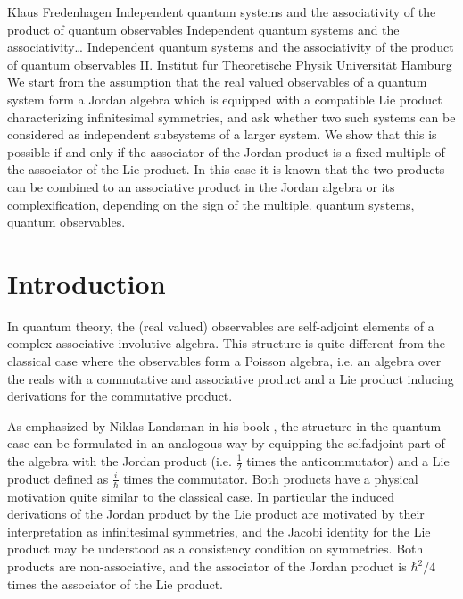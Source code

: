 \begin{artengenv}{Klaus Fredenhagen}
	{Independent quantum systems and the associativity of the product of quantum observables}
	{Independent quantum systems and the associativity\ldots}
	{Independent quantum systems and the associativity of the product of quantum observables}
	{II. Institut f\"ur Theoretische Physik Universit\"at Hamburg}
	{We start from the assumption that the real valued observables of a quantum system form a Jordan algebra which is equipped with a compatible Lie product characterizing infinitesimal symmetries,
		and ask whether two such systems can be considered as independent subsystems of a larger system. We show that this  is possible if and only if the associator of the Jordan product is a fixed multiple of the associator of the Lie product. In this case it is known that the two products can be combined to an associative product in the Jordan algebra or its complexification, depending on the sign of the multiple.}
	{quantum systems, quantum observables.}
	
	

\section{Introduction}
\lettrine[loversize=0.13,lines=2,lraise=-0.05,nindent=0em,findent=0.2pt]%
{I}{}n quantum theory, the (real valued) observables are self-adjoint elements of a complex associative involutive algebra. This structure is quite different from the classical case where the observables form a Poisson algebra, i.e. an algebra over the reals with a commutative and associative product  and a Lie product inducing derivations for the commutative product. 

As emphasized by Niklas Landsman in his book \parencite*{Landsman}, the structure in the quantum case can be formulated in an analogous way by equipping the selfadjoint part of the algebra with the Jordan product (i.e. $\frac12$ times the anticommutator) and a Lie product defined as $\frac{i}{\hbar}$ times the commutator.
Both products have a physical motivation quite similar to the classical case. In particular the induced derivations of the Jordan product by the Lie product are motivated by their interpretation as infinitesimal symmetries, and the Jacobi identity for the Lie product may be understood as a consistency condition on symmetries. Both products are non-associative, and the associator of the Jordan product is $\hbar^2/4$ times the associator of the Lie product. 


\end{artengenv}
